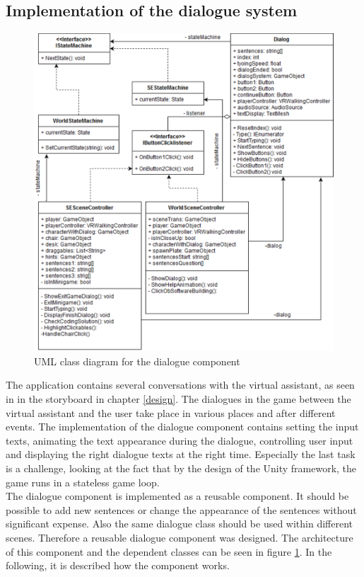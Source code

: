 \subsection{Implementation of the dialogue system}
\begin{figure}[h!]
  \includegraphics[width=16cm]{kapitel/eps/uml-dialog.pdf}
  \centering
  \caption{UML class diagram for the dialogue component}
  \label{fig:uml-controller}
\end{figure}
The application contains several conversations with the virtual assistant, as seen in in the storyboard in chapter \ref{design}. The dialogues in the game between the virtual assistant and the user take place in various places and after different events. The implementation of the dialogue component contains setting the input texts, animating the text appearance during the dialogue, controlling user input and displaying the right dialogue texts at the right time. Especially the last task is a challenge, looking at the fact that by the design of the Unity framework, the game runs in a stateless game loop.\\
 The dialogue component is implemented as a reusable component. It should be possible to add new sentences or change the appearance of the sentences without significant expense. Also the same dialogue class should be used within different scenes. Therefore a reusable dialogue component was designed. The architecture of this component and the dependent classes can be seen in figure \ref{fig:uml-controller}. In the following, it is described how the component works.\\
